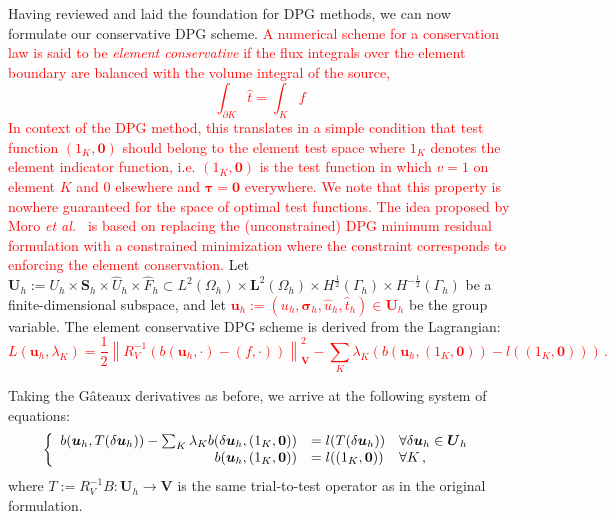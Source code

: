 \documentclass[letterpaper]{article}
\def\btau{\boldsymbol\tau}
\def\bftau{\boldsymbol\tau}
\def\bfsigma{\boldsymbol\sigma}
\newcommand{\bs}[1]{\boldsymbol{#1}}
\newcommand{\norm}[1]{\left\| #1 \right\|}
\newcommand{\ptl}{{\partial}}
\def\etal{{\it et al.~}}
\newcommand{\red}[1]{\textcolor{red}{#1}}
\begin{document}
Having reviewed and laid the foundation for DPG methods, we can now formulate our conservative DPG scheme.  %
\textcolor{red}{
A numerical scheme for a conservation law is said to be {\em element conservative}
if the flux integrals over the element boundary are balanced with the volume integral
of the source,
$$
\int_{\ptl K} \hat{t} = \int_K f
$$
In context of the DPG method, this translates in a simple condition that test function
$(1_K,\bs0)$ should belong to the element test space where $1_K$ denotes the element
indicator function, i.e. $(1_K , \bs0)$ is the test function in which $v = 1$ on element $K$
and $0$ elsewhere and $\bftau = \bs0$ everywhere. We note that this property is nowhere
guaranteed for the space of optimal test functions. The idea proposed by Moro \etal\cite{MoroNguyenPeraire11}
is based on replacing the (unconstrained) DPG  minimum residual formulation with
a constrained minimization where the constraint corresponds to enforcing
the element conservation.}
Let $\bs U_h:=U_h\times\bs S_h\times\hat U_h\times\hat F_h\subset L^2(\Omega_h)\times\bs
L^2(\Omega_h)\times H^{\frac{1}{2}}(\Gamma_h)\times H^{-\frac{1}{2}}(\Gamma_h)$
be a finite-dimensional subspace, and let 
\red{
$\bs u_h:=(u_h,\bfsigma_h,\hat u_h,\hat t_h)\in\bs U_h$ 
}
be the group variable. The element conservative DPG scheme is
derived from the Lagrangian:
\red{
\begin{equation}
L(\bs u_h,\lambda_K)=\frac{1}{2}\norm{R_V^{-1}(b(\bs
u_h,\cdot)-(f,\cdot))}^2_{\bs V}-\sum_K\lambda_K(b(\bs u_h,(1_K,\bs0))-l((1_K,\bs0)))\,.
\label{eq:lagrangian}
\end{equation}
}

Taking the G\^ateaux derivatives as before, we arrive at the following system
of equations:
\red{
\begin{equation}
\left\{
\begin{array}[c]{rll}
b(\bs u_h,T(\delta\bs u_h))-\sum_K\lambda_K b(\delta\bs u_h,(1_K,\bs0))
&=l(T(\delta\bs u_h)) & \forall\delta\bs u_h\in\bs U_h\\
b(\bs u_h,(1_K,\bs0)) &=l((1_K,\bs0)) & \forall K\,,
\end{array}
\right.
\label{eq:conservativeSystem}
\end{equation}
}
where $T:=R_V^{-1}B:\bs U_h\rightarrow\bs V$ is the same trial-to-test operator as in the original formulation.
\end{document}
